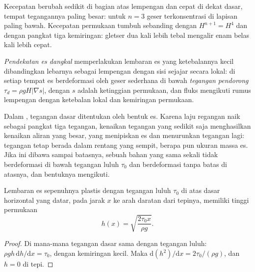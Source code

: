 Kecepatan berubah sedikit di bagian atas lempengan dan cepat di dekat
dasar, tempat tegangannya paling besar: untuk $n = 3$ geser terkonsentrasi di
lapisan paling bawah. Kecepatan permukaan tumbuh sebanding dengan $H^{n+1} = H^4$ dan dengan
pangkat tiga kemiringan: gletser dua kali lebih tebal mengalir enam belas kali lebih cepat.

\begin{definition}\label{def:b3:glaciology:sia}
\emph{Pendekatan es dangkal} memperlakukan
lembaran es yang ketebalannya kecil dibandingkan lebarnya sebagai lempengan
dengan sisi sejajar secara lokal: di setiap tempat es berdeformasi oleh geser sederhana di bawah
\emph{tegangan pendorong} $\tau_d = \rho gH|\nabla s|$, dengan $s$ adalah
ketinggian permukaan, dan fluks mengikuti rumus lempengan dengan
ketebalan lokal dan kemiringan permukaan.
\end{definition}

Dalam , tegangan dasar ditentukan oleh bentuk
es. Karena laju regangan naik sebagai pangkat tiga tegangan, kenaikan tegangan yang
sedikit saja menghasilkan kenaikan aliran yang besar, yang menipiskan es
dan menurunkan tegangan lagi: tegangan tetap berada dalam rentang yang sempit,
berapa pun ukuran massa es. Jika ini dibawa sampai batasnya, sebuah bahan yang
sama sekali tidak berdeformasi di bawah tegangan luluh $\tau_0$ dan berdeformasi tanpa
batas di atasnya, dan bentuknya mengikuti.

\begin{proposition}\label{prop:b3:glaciology:nye}
Lembaran es sepenuhnya plastis dengan tegangan luluh $\tau_0$ di atas dasar
horizontal yang datar, pada jarak $x$ ke arah daratan dari tepinya, memiliki tinggi permukaan
\[
h(x) = \sqrt{\frac{2\tau_0x}{\rho g}} .
\]
\end{proposition}

\begin{proof}
Di mana-mana tegangan dasar sama dengan tegangan luluh: $\rho gh\,\mathrm
dh/\mathrm dx = \tau_0$, dengan kemiringan kecil. Maka $\mathrm d(h^2)/\mathrm
dx = 2\tau_0/(\rho g)$, dan $h = 0$ di tepi.
\end{proof}

